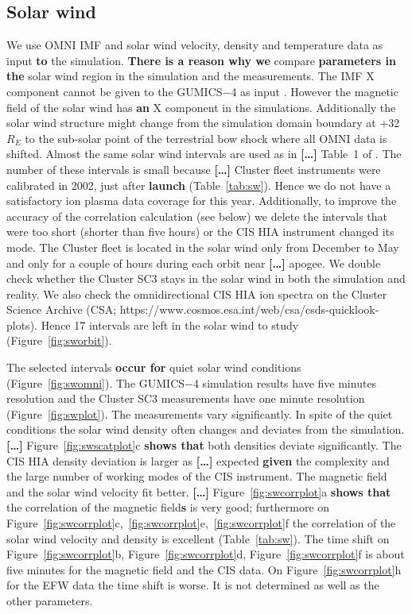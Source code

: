 \documentclass[linenumbers,draft]{agujournal}
\begin{document}
\subsection{Solar wind}
\label{sec:sw}

We use OMNI IMF and solar wind velocity, density and temperature data as input \textbf{to} the simulation. \textbf{There is a reason why we} compare \textbf{parameters in the} solar wind region in the simulation and the measurements. The IMF X component cannot be given to the GUMICS$-$4 as input \citep{janhunen12:_gumic_mhd,facsko16:_one_earth}. However the magnetic field of the solar wind has \textbf{an} X component in the simulations. Additionally the solar wind structure might change from the simulation domain boundary at +32\,$R_E$ to the sub-solar point of the terrestrial bow shock where all OMNI data is shifted. Almost the same solar wind intervals are used as in \textbf{[\dots]} Table~1 of \citet{facsko16:_one_earth}. The number of these intervals is small because \textbf{[\dots]} Cluster fleet instruments were calibrated in 2002, just after \textbf{launch} (Table~\ref{tab:sw}). Hence we do not have a satisfactory ion plasma data coverage for this year. Additionally, to improve the accuracy of the correlation calculation (see below) we delete the intervals that were too short (shorter than five hours) or the CIS HIA instrument changed its mode. The Cluster fleet is located in the solar wind only from December to May and only for a couple of hours during each orbit near \textbf{[\dots]} apogee. We double check whether the Cluster SC3 stays in the solar wind in both the simulation and reality. We also check the omnidirectional CIS HIA ion spectra on the Cluster Science Archive (CSA; https://www.cosmos.esa.int/web/csa/csds-quicklook-plots). Hence 17 intervals are left in the solar wind to study (Figure~\ref{fig:sworbit}). 

The selected intervals \textbf{occur for} quiet solar wind conditions (Figure~\ref{fig:swomni}). The GUMICS$-$4 simulation results have five minutes resolution and the Cluster SC3 measurements have one minute resolution (Figure~\ref{fig:swplot}). The measurements vary significantly. In spite of the quiet conditions the solar wind density often changes and deviates from the simulation. \textbf{[\dots]} Figure~\ref{fig:swscatplot}c \textbf{shows that} both densities deviate significantly. The CIS HIA density deviation is larger as \textbf{[\dots]} expected \textbf{given} the complexity and the large number of working modes of the CIS instrument. The magnetic field and the solar wind velocity fit better. \textbf{[\dots]} Figure~\ref{fig:swcorrplot}a \textbf{shows that} the correlation of the magnetic field\textbf{s} is very good; furthermore on Figure~\ref{fig:swcorrplot}c,~\ref{fig:swcorrplot}e,~\ref{fig:swcorrplot}f the correlation of the solar wind velocity and density is excellent (Table~\ref{tab:sw}). The time shift on Figure~\ref{fig:swcorrplot}b, Figure~\ref{fig:swcorrplot}d, Figure~\ref{fig:swcorrplot}f is about five minutes for the magnetic field and the CIS data. On Figure~\ref{fig:swcorrplot}h for the EFW data the time shift is worse. It is not determined as well as the other parameters.
\end{document}
